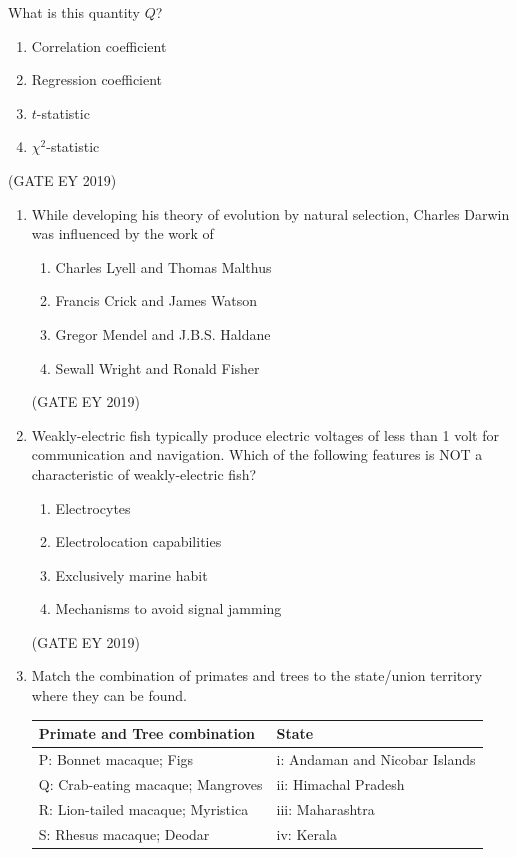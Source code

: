 \documentclass[journal,12pt,onecolumn]{IEEEtran}
\theoremstyle{remark}
\begin{document}
\begin{enumerate}[resume]
What is this quantity $Q$?
\begin{enumerate}[nosep]
\item Correlation coefficient
\item Regression coefficient
\item $t$-statistic
\item $\chi^2$-statistic
\end{enumerate}
\hfill{(GATE EY 2019)}

\end{enumerate}

\begin{enumerate}[resume]

\item While developing his theory of evolution by natural selection, Charles Darwin was influenced by the work of  
\begin{multicols}{2}
\begin{enumerate}
\item Charles Lyell and Thomas Malthus  
\item Francis Crick and James Watson  
\item Gregor Mendel and J.B.S. Haldane  
\item Sewall Wright and Ronald Fisher  
\end{enumerate}
\end{multicols}
\hfill{(GATE EY 2019)}
\item Weakly-electric fish typically produce electric voltages of less than 1 volt for communication and navigation. Which of the following features is NOT a characteristic of weakly-electric fish?  
\begin{multicols}{2}
\begin{enumerate}
\item Electrocytes  
\item Electrolocation capabilities  
\item Exclusively marine habit  
\item Mechanisms to avoid signal jamming  
\end{enumerate}
\end{multicols}
\hfill{(GATE EY 2019)}
\item Match the combination of primates and trees to the state/union territory where they can be found.  

\begin{center}
\begin{tabular}{|l|l|}
\hline
\textbf{Primate and Tree combination} & \textbf{State} \\
\hline
P: Bonnet macaque; Figs & i: Andaman and Nicobar Islands \\
Q: Crab-eating macaque; Mangroves & ii: Himachal Pradesh \\
R: Lion-tailed macaque; Myristica & iii: Maharashtra \\
S: Rhesus macaque; Deodar & iv: Kerala \\
\hline
\end{tabular}
\end{center}


\end{enumerate}
\end{document}
